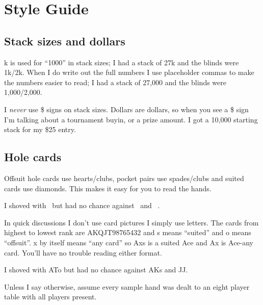 \chapter{Style Guide}


\section*{Stack sizes and dollars}

k is used for ``1000'' in stack sizes; I had a stack of 27k and the
blinds were 1k/2k. When I do write out the full numbers I use
placeholder commas to make the numbers easier to read; I had a stack
of 27,000 and the blinds were 1,000/2,000.

I \textit{never} use \$ signs on stack sizes. Dollars are dollars, so
when you see a \$ sign I'm talking about a tournament buyin, or a
prize amount. I got a 10,000 starting stack for my \$25 entry.


\section*{Hole cards}

Offsuit hole cards use hearts/clubs, pocket pairs use spades/clubs and
suited cards use diamonds. This makes it easy for you to read the hands.

I shoved with \Ah\tenc\ but had no chance against \Ad\Kd\ and \Js\Jc\ .

In quick discussions I don't use card pictures I simply use
letters. The cards from highest to lowest rank are AKQJT98765432 and s
means ``suited'' and o means ``offsuit''. x by itself means ``any
card'' so Axs is a suited Ace and Ax is Ace-any card. You'll have no
trouble reading either format.

I shoved with ATo but had no chance against AKs and JJ.

Unless I say otherwise, assume every sample hand was dealt to an eight
player table with all players present.

